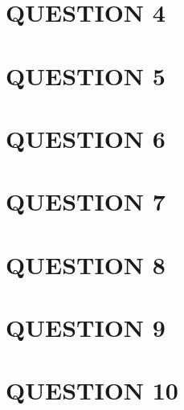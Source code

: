 \documentclass[a4paper]{article}
\begin{document}
\section{QUESTION 4}
\section{QUESTION 5}
\section{QUESTION 6}
\section{QUESTION 7}
\section{QUESTION 8}
\section{QUESTION 9}
\section{QUESTION 10}
\end{document}
